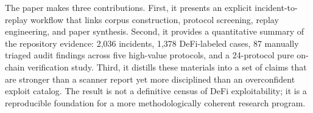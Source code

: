 The paper makes three contributions. First, it presents an explicit incident-to-replay workflow that links corpus construction, protocol screening, replay engineering, and paper synthesis. Second, it provides a quantitative summary of the repository evidence: 2{,}036 incidents, 1{,}378 DeFi-labeled cases, 87 manually triaged audit findings across five high-value protocols, and a 24-protocol pure on-chain verification study. Third, it distills these materials into a set of claims that are stronger than a scanner report yet more disciplined than an overconfident exploit catalog. The result is not a definitive census of DeFi exploitability; it is a reproducible foundation for a more methodologically coherent research program.
